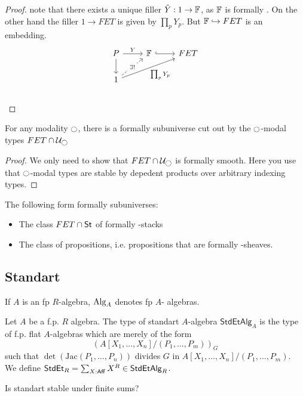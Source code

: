 \begin{proof}
	note that there exists a unique filler $\tilde Y : 1 \to \mathbb{F}$, as $\mathbb{F}$ is formally \etale. On the other hand the filler $1 \to FET$ is given by $\prod_p Y_p$. But $\mathbb{F} \hookrightarrow FET$ is an embedding.
	\[\begin{tikzcd}
		P & \bF & FET \\
		1
		\arrow["Y", from=1-1, to=1-2]
		\arrow[from=1-1, to=2-1]
		\arrow[hook, from=1-2, to=1-3]
		\arrow["{\exists!}"{description}, dashed, from=2-1, to=1-2]
		\arrow["{\prod_p Y_p}"', from=2-1, to=1-3]
	\end{tikzcd}\]\\
	
	
	
\end{proof}
\begin{prop}
	For any modality $\ci$, there is a formally \etale subuniverse cut out by the $\ci$-modal types $FET \cap \cU_{\ci}$
\end{prop}
\begin{proof}
	We only need to show that $FET \cap \cU_{\ci}$ is formally smooth. Here you use that $\ci$-modal types are stable by depedent products over arbitrary indexing types.
\end{proof}
\begin{example}{\label{lemma:FETSt}}
	The following form formally \etale subuniverses:
	\begin{itemize}
		\item 	The class $FET \cap \mathsf{St}$ of formally \etale \etale-stacks
		\item 	The class of \etale propositions, i.e. propositions that are formally \etale \etale-sheaves.
	\end{itemize}	
\end{example}

\subsection{Standart \etale}
If $A$ is an fp $R$-algebra, $\operatorname{Alg}_A$ denotes fp $A$- algebras.
\begin{definition}
	Let $A$ be a f.p. $R$ algebra. The type of standart \etale $A$-algebra $\mathsf{StdEtAlg}_A$ is the type of f.p. flat $A$-algebras which are merely of the form
	\[
	\left (A[X_1,\hdots,X_n] / (P_1,\hdots,P_m) \right)_G
	\]
	such that $\det (\mathrm{Jac}(P_1,\hdots,P_n))$ divides $G$ in $A[X_1,\hdots,X_n] / (P_1,\hdots,P_m) $. \\
	We define $\mathsf{StdEt}_R = \sum_{X : \mathsf{Aff}} X^R \in \mathsf{StdEtAlg}_R$.
\end{definition}
\begin{question}
	Is standart \etale stable under finite sums?
\end{question}

